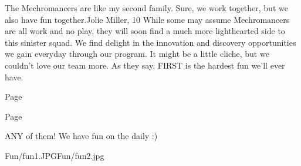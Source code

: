 {The Mechromancers are like my second family. Sure, we work together, but we also have fun together.}{Jolie Miller, 10}
{While some may assume Mechromancers are all work and no play, they will soon find a much more lighthearted side to this sinister squad. We find delight in the innovation and discovery opportunities we gain everyday through our program. It might be a little cliche, but we couldn’t love our team more. As they say, FIRST is the hardest fun we’ll ever have.}
{\item[$\blacksquare$] Page \pageref{fun:1}
 \item[$\blacksquare$] Page \pageref{competition:3}
 \item[$\blacksquare$] ANY of them! We have fun on the daily :)}
{Fun/fun1.JPG}{Fun/fun2.jpg}

